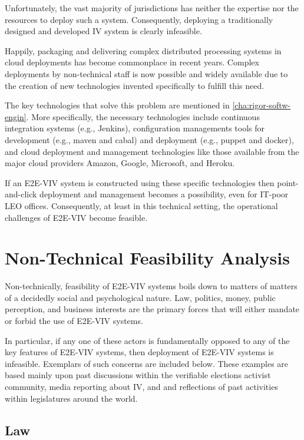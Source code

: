 Unfortunately, the vast majority of jurisdictions has neither the
expertise nor the resources to deploy such a system. Consequently,
deploying a traditionally designed and developed IV system is clearly
infeasible.

Happily, packaging and delivering complex distributed processing
systems in cloud deployments has become commonplace in recent years.
Complex deployments by non-technical staff is now possible and widely
available due to the creation of new technologies invented
specifically to fulfill this need. 

The key technologies that solve this problem are mentioned in
\autoref{cha:rigor-softw-engin}.  More specifically, the necessary
technologies include continuous integration systems (e.g., Jenkins),
configuration managements tools for development (e.g., maven and
cabal) and deployment (e.g., puppet and docker), and cloud deployment
and management technologies like those available from the major cloud
providers Amazon, Google, Microsoft, and Heroku.

If an E2E-VIV system is constructed using these specific technologies
then point-and-click deployment and management becomes a possibility,
even for IT-poor LEO offices.  Consequently, at least in this
technical setting, the operational challenges of E2E-VIV become
feasible.

\section{Non-Technical Feasibility Analysis}

Non-technically, feasibility of E2E-VIV systems boils down to matters
of matters of a decidedly social and psychological nature.  Law,
politics, money, public perception, and business interests are the
primary forces that will either mandate or forbid the use of E2E-VIV
systems. 

In particular, if any one of these actors is fundamentally opposed to
any of the key features of E2E-VIV systems, then deployment of E2E-VIV
systems is infeasible. Exemplars of such concerns are included below.
These examples are based mainly upon past discussions within the
verifiable elections activist community, media reporting about IV, and
and reflections of past activities within legislatures around the
world.

\subsection{Law}

